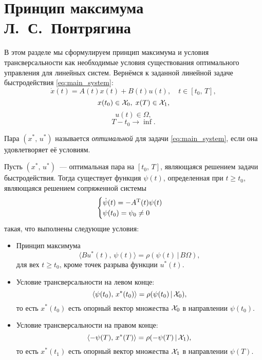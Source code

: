 \section{Принцип максимума Л.~С.~Понтрягина}

В этом разделе мы сформулируем принцип максимума и условия трансверсальности как необходимые условия существования оптимального управления для линейных систем. Вернёмся к заданной линейной задаче быстродействия \eqref{eq:main_system}:
$$
        \dot x(t) = A(t)x(t) + B(t)u(t),\quad t \in [t_0,\,T],
$$
$$
        x(t_0) \in \mathcal{X}_0,\; x(T) \in \mathcal{X}_1,
$$
$$
        u(t) \in \Omega,
$$
$$
        T - t_0 \rightarrow \inf.
$$

\begin{definition}
        Пара $(x^*,\,u^*)$ называется \textit{оптимальной} для задачи \eqref{eq:main_system}, если она удовлетворяет её условиям.
\end{definition}

\begin{theorem}[Л.~С.~Понтрягин]
        Пусть $(x^*,\,u^*)$~--- оптимальная пара на $[t_0,\,T]$, являющаяся решением задачи быстродействия. Тогда существует функция $\psi(t)$, определенная при $t \geqslant t_0$, являющаяся решением сопряженной системы
        $$
                \begin{cases}
                        \dot\psi(t) = -A^{\mathrm{T}}(t)\psi(t)\\
                        \psi(t_0) = \psi_0 \neq 0
                \end{cases}
        $$ 
        такая, что выполнены следующие условия:

        \begin{itemize}
                \item Принцип максимума
                $$
                        \langle Bu^*(t),\,\psi(t)\rangle = \rho(\psi(t)\,|\,B\Omega),
                $$
                для вех $t \geqslant t_0$, кроме точек разрыва функции $u^*(t)$.

                \item Условие трансверсальности на левом конце:
                $$
                        \langle \psi(t_0),\,x^*(t_0)\rangle = \rho(\psi(t_0)\,|\,\mathcal{X}_0),
                $$
                то есть $x^*(t_0)$ есть опорный вектор множества $\mathcal{X}_0$ в направлении $\psi(t_0)$.

                \item Условие трансверсальности на правом конце:
                $$
                        \langle -\psi(T),\,x^*(T)\rangle = \rho(-\psi(T)\,|\,\mathcal{X}_1),
                $$
                то есть $x^*(t_1)$ есть опорный вектор множества $\mathcal{X}_1$ в направлении $\psi(T)$.
        \end{itemize}
\end{theorem}